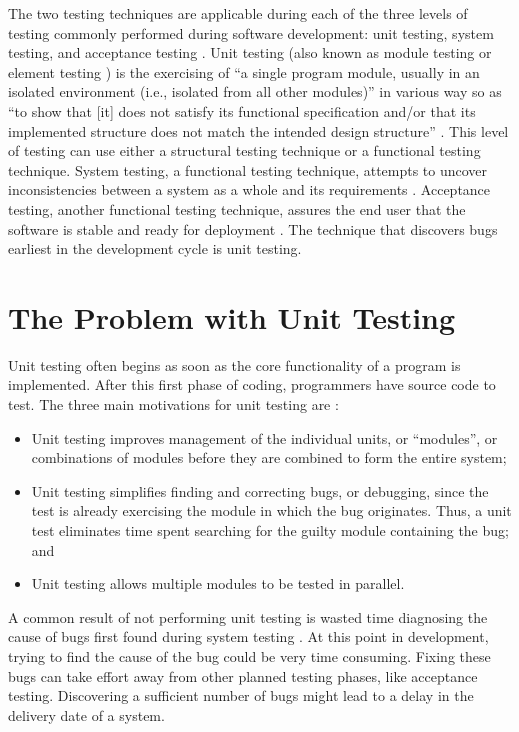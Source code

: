 The two testing techniques are applicable during each of the three levels
of testing commonly performed during software development: unit testing,
system testing, and acceptance testing \cite{Hetzel:1984}.  Unit testing
(also known as module testing or element testing \cite{Kaner:1999}) is the
exercising of ``a single program module, usually in an isolated environment
(i.e., isolated from all other modules)'' \cite{Myers:1976} in various way
so as ``to show that [it] does not satisfy its functional specification
and/or that its implemented structure does not match the intended design
structure'' \cite{Beizer:1990}.  This level of testing can use either a
structural testing technique or a functional testing technique.  System
testing, a functional testing technique, attempts to uncover
inconsistencies between a system as a whole and its requirements
\cite{Myers:1976}.  Acceptance testing, another functional testing
technique, assures the end user that the software is stable and ready for
deployment \cite{Hetzel:1984}.  The technique that discovers bugs earliest
in the development cycle is unit testing.

\section{The Problem with Unit Testing}
Unit testing often begins as soon as the core functionality of a program is
implemented.  After this first phase of coding, programmers have source
code to test.  The three main motivations for unit testing are
\cite{Myers:1979}:

\begin{itemize}
\item Unit testing improves management of the individual units, or
      ``modules'', or combinations of modules before they are combined to
      form the entire system;
\item Unit testing simplifies finding and correcting bugs, or debugging,
      since the test is already exercising the module in which the bug
      originates.  Thus, a unit test eliminates time spent searching for
      the guilty module containing the bug; and
\item Unit testing allows multiple modules to be tested in parallel.
\end{itemize}
A common result of not performing unit testing is wasted time diagnosing
the cause of bugs first found during system testing \cite{Crispin:2002}.
At this point in development, trying to find the cause of the bug could be
very time consuming.  Fixing these bugs can take effort away from other
planned testing phases, like acceptance testing.  Discovering a sufficient
number of bugs might lead to a delay in the delivery date of a system.


